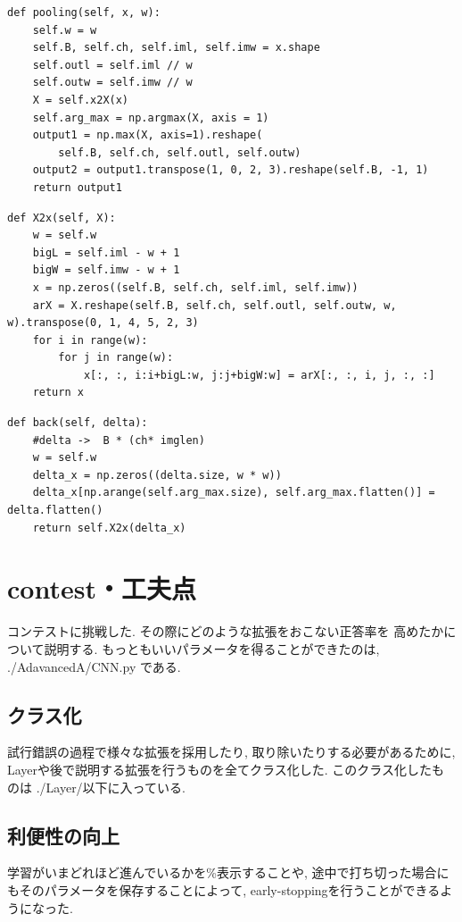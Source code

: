 \documentclass[a4paper,11pt]{jsarticle}
\begin{document}
\begin{lstlisting}[caption=pooling\_prop]
  def pooling(self, x, w):
    self.w = w
    self.B, self.ch, self.iml, self.imw = x.shape
    self.outl = self.iml // w
    self.outw = self.imw // w
    X = self.x2X(x)
    self.arg_max = np.argmax(X, axis = 1)
    output1 = np.max(X, axis=1).reshape(
        self.B, self.ch, self.outl, self.outw)
    output2 = output1.transpose(1, 0, 2, 3).reshape(self.B, -1, 1)
    return output1
\end{lstlisting}

\begin{lstlisting}[caption=pooling\_X2x]
  def X2x(self, X):
    w = self.w
    bigL = self.iml - w + 1
    bigW = self.imw - w + 1
    x = np.zeros((self.B, self.ch, self.iml, self.imw))
    arX = X.reshape(self.B, self.ch, self.outl, self.outw, w, w).transpose(0, 1, 4, 5, 2, 3)
    for i in range(w):
        for j in range(w):
            x[:, :, i:i+bigL:w, j:j+bigW:w] = arX[:, :, i, j, :, :]
    return x
\end{lstlisting}

\begin{lstlisting}[caption=pooling\_back]
  def back(self, delta):
    #delta ->  B * (ch* imglen) 
    w = self.w
    delta_x = np.zeros((delta.size, w * w))
    delta_x[np.arange(self.arg_max.size), self.arg_max.flatten()] = delta.flatten()
    return self.X2x(delta_x)
\end{lstlisting}

\section{contest・工夫点}
コンテストに挑戦した. その際にどのような拡張をおこない正答率を
高めたかについて説明する.
もっともいいパラメータを得ることができたのは, ./AdavancedA/CNN.py
である.

\subsection{クラス化}
試行錯誤の過程で様々な拡張を採用したり, 取り除いたりする必要があるために,
Layerや後で説明する拡張を行うものを全てクラス化した. このクラス化したものは
./Layer/以下に入っている.

\subsection{利便性の向上}
学習がいまどれほど進んでいるかを\%表示することや,
途中で打ち切った場合にもそのパラメータを保存することによって,
early-stoppingを行うことができるようになった.
\end{document}
